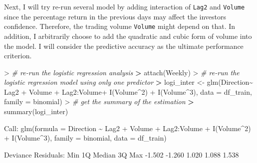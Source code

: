\documentclass[
]{article}
\newenvironment{Shaded}{\begin{snugshade}}{\end{snugshade}}
\newcommand{\AttributeTok}[1]{\textcolor[rgb]{0.77,0.63,0.00}{#1}}
\newcommand{\CommentTok}[1]{\textcolor[rgb]{0.56,0.35,0.01}{\textit{#1}}}
\newcommand{\DecValTok}[1]{\textcolor[rgb]{0.00,0.00,0.81}{#1}}
\newcommand{\ErrorTok}[1]{\textcolor[rgb]{0.64,0.00,0.00}{\textbf{#1}}}
\newcommand{\FloatTok}[1]{\textcolor[rgb]{0.00,0.00,0.81}{#1}}
\newcommand{\FunctionTok}[1]{\textcolor[rgb]{0.00,0.00,0.00}{#1}}
\newcommand{\NormalTok}[1]{#1}
\newcommand{\OtherTok}[1]{\textcolor[rgb]{0.56,0.35,0.01}{#1}}
\newcommand{\SpecialCharTok}[1]{\textcolor[rgb]{0.00,0.00,0.00}{#1}}
\begin{document}
Next, I will try re-run several model by adding interaction of
\texttt{Lag2} and \texttt{Volume} since the percentage return in the
previous days may affect the investors confidence. Therefore, the
trading volume \texttt{Volume} might depend on that. In addition, I
arbitrarily choose to add the quadratic and cubic form of volume into
the model. I will consider the predictive accuracy as the ultimate
performance criterion.

\begin{Shaded}
\begin{Highlighting}[]
\SpecialCharTok{\textgreater{}} \CommentTok{\# re{-}run the logistic regression analysis}
\ErrorTok{\textgreater{}} \FunctionTok{attach}\NormalTok{(Weekly)}
\SpecialCharTok{\textgreater{}} \CommentTok{\# re{-}run the logistic regression model using only one predictor}
\ErrorTok{\textgreater{}}\NormalTok{ logi\_inter }\OtherTok{\textless{}{-}} \FunctionTok{glm}\NormalTok{(Direction}\SpecialCharTok{\textasciitilde{}}\NormalTok{ Lag2 }\SpecialCharTok{+}\NormalTok{ Volume }\SpecialCharTok{+}\NormalTok{ Lag2}\SpecialCharTok{:}\NormalTok{Volume}\SpecialCharTok{+} \FunctionTok{I}\NormalTok{(Volume}\SpecialCharTok{\^{}}\DecValTok{2}\NormalTok{) }\SpecialCharTok{+} \FunctionTok{I}\NormalTok{(Volume}\SpecialCharTok{\^{}}\DecValTok{3}\NormalTok{), }\AttributeTok{data =}\NormalTok{ df\_train, }\AttributeTok{family =}\NormalTok{ binomial)}
\SpecialCharTok{\textgreater{}} \CommentTok{\# get the summary of the estimation}
\ErrorTok{\textgreater{}} \FunctionTok{summary}\NormalTok{(logi\_inter)}

\NormalTok{Call}\SpecialCharTok{:}
\FunctionTok{glm}\NormalTok{(}\AttributeTok{formula =}\NormalTok{ Direction }\SpecialCharTok{\textasciitilde{}}\NormalTok{ Lag2 }\SpecialCharTok{+}\NormalTok{ Volume }\SpecialCharTok{+}\NormalTok{ Lag2}\SpecialCharTok{:}\NormalTok{Volume }\SpecialCharTok{+} \FunctionTok{I}\NormalTok{(Volume}\SpecialCharTok{\^{}}\DecValTok{2}\NormalTok{) }\SpecialCharTok{+} 
    \FunctionTok{I}\NormalTok{(Volume}\SpecialCharTok{\^{}}\DecValTok{3}\NormalTok{), }\AttributeTok{family =}\NormalTok{ binomial, }\AttributeTok{data =}\NormalTok{ df\_train)}

\NormalTok{Deviance Residuals}\SpecialCharTok{:} 
\NormalTok{   Min      1Q  Median      3Q     Max  }
\SpecialCharTok{{-}}\FloatTok{1.502}  \SpecialCharTok{{-}}\FloatTok{1.260}   \FloatTok{1.020}   \FloatTok{1.088}   \FloatTok{1.538}  


\end{Highlighting}
\end{Shaded}
\end{document}
